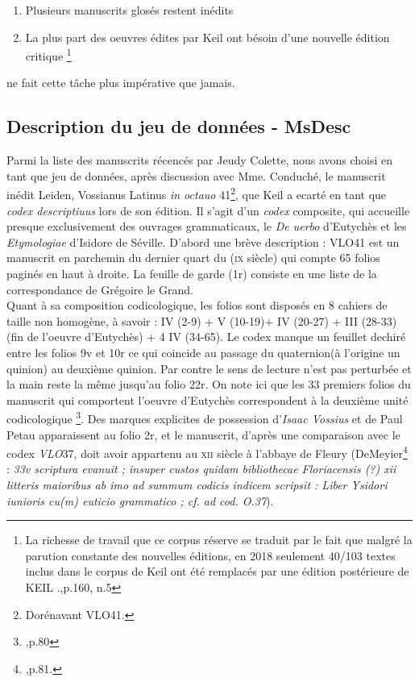 \documentclass[a4paper, twoside, 12pt]{book}
\begin{document}
\begin{enumerate}
    \item Plusieurs manuscrits glosés restent inédits
    \item La plus part des oeuvres édites par Keil ont bésoin d'une nouvelle édition critique \footnote{ La richesse de travail que ce corpus réserve se traduit par le fait que malgré la parution constante des nouvelles éditions, en 2018 seulement 40/103 textes inclus dans le corpus de Keil ont été remplacés par une édition postérieure de KEIL .\cite{zetzel2018critics},p.160, n.5}
\end{enumerate}
ne fait cette tâche plus impérative que jamais.


\subsection{Description du jeu de données - MsDesc}

Parmi la liste des manuscrits récencés par Jeudy Colette, nous avons choisi en tant que jeu de données, après discussion avec Mme. Conduché, le manuscrit inédit  Leiden, Vossianus Latinus \textit{in octauo} 41\footnote{Dorénavant VLO41.}, que Keil a ecarté en tant que \textit{codex descriptiuus} lors de son édition. Il s'agit d'un \textit{codex} composite, qui accueille presque exclusivement des ouvrages grammaticaux, le  \textit{De uerbo} d'Eutychès et les \textit{Etymologiae} d'Isidore de Séville. D'abord une brève description : VLO41 est un manuscrit en parchemin du dernier quart du (\textsc{ix}\ieme{} siècle) qui compte  65 folios paginés en haut à droite. La feuille de garde (1r) consiste en une liste de la correspondance de Grégoire le Grand.\\

Quant à sa composition codicologique,  les folios sont disposés en 8 cahiers de taille non homogène, à savoir : IV (2-9) + V (10-19)+ IV (20-27) + III (28-33) (fin de l'oeuvre d'Eutychès) + 4 IV (34-65). Le codex manque un feuillet dechiré entre les folios 9v et 10r ce qui coincide au passage du quaternion(à l'origine un quinion) au deuxième quinion. Par contre le sens de lecture n'est pas perturbée et la main reste la même jusqu'au folio 22r. On note ici que les 33 premiers folios du manuscrit qui comportent l'oeuvre d'Eutychès correspondent à la deuxième unité codicologique \footnote{\cite{de1973codices},p.80}. Des marques explicites de possession d'\textit{Isaac Vossius} et de Paul Petau apparaissent au folio 2r, et le manuscrit, d'après une comparaison avec le codex \textit{VLO}37, doit avoir appartenu au \textsc{xii}\ieme{} siècle à l'abbaye de Fleury (DeMeyier\footnote{\cite{de1973codices},p.81.} : \textit{33v scriptura evanuit ; insuper custos quidam bibliothecae Floriacensis (?) xii litteris maioribus ab imo ad summum codicis indicem scripsit : Liber Ysidori iunioris cu(m) euticio grammatico ; cf. ad cod. O.37}).\\
\end{document}

